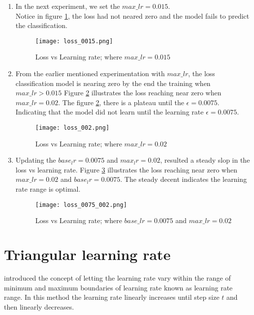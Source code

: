 \begin{enumerate}
    \item In the next experiment, we set the $max\_lr = 0.015$. \\
    Notice in figure \ref{fig:Loss value at 0.015}, the loss had not neared zero and the model fails to predict the classification. 
    \begin{figure}[H]
        \centering    
        \texttt{[image: loss\_0015.png]}
        \caption{Loss vs Learning rate; where $max\_lr = 0.015$}
        \label{fig:Loss value at 0.015}
    \end{figure}

    \item From the earlier mentioned experimentation with $max\_lr$,  the loss classification model is nearing zero by the end the training  when  $max\_lr > 0.015$ 
    Figure \ref{fig:Loss value at 0.02} illustrates the loss reaching near zero when $max\_lr = 0.02$. The figure  \ref{fig:Loss value at 0.02}, there is a plateau until the $ \epsilon = 0.0075$. Indicating that the model did not learn until the learning rate $ \epsilon = 0.0075$.
    \begin{figure}[H]
        \centering    
        \texttt{[image: loss\_002.png]}
        \caption{Loss vs Learning rate; where $max\_lr = 0.02$}
        \label{fig:Loss value at 0.02}
    \end{figure}

    \item Updating the $base_lr=0.0075$ and $max_lr=0.02$, resulted a steady slop in the loss vs learning rate.  
    Figure \ref{fig:Loss value at 0.0075} illustrates the loss reaching near zero when $max\_lr = 0.02$ and $base_lr=0.0075$. The steady decent indicates the learning rate range is optimal.
    \begin{figure}[H]
        \centering    
        \texttt{[image: loss\_0075\_002.png]}
        \caption{Loss vs Learning rate; where $base\_lr = 0.0075$ and $max\_lr = 0.02$ }
        \label{fig:Loss value at 0.0075}
    \end{figure}
    

\end{enumerate}

\section{Triangular learning rate}

\parencite{Smith.03062015} introduced the concept of letting the learning rate vary within the range of minimum and maximum boundaries of learning rate known as learning rate range. In this method the learning rate linearly increases until step size $ t $ and then linearly decreases. 


